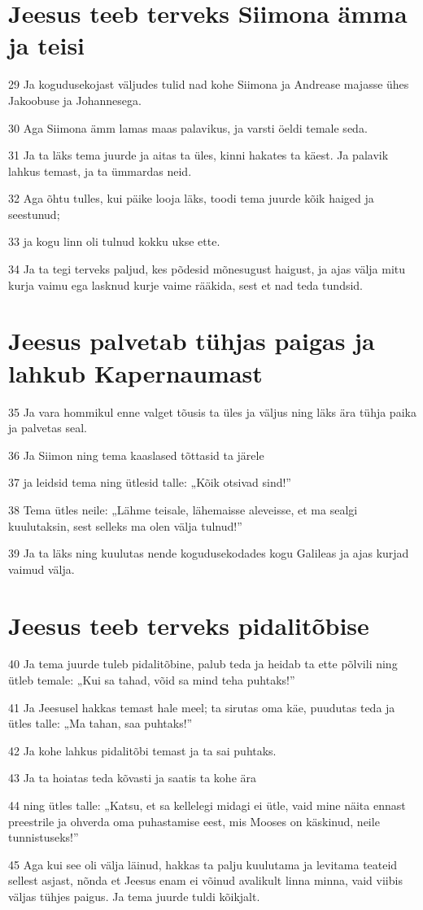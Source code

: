 \section*{Jeesus teeb terveks Siimona ämma ja teisi}

\par 29 Ja kogudusekojast väljudes tulid nad kohe Siimona ja Andrease majasse ühes Jakoobuse ja Johannesega.
\par 30 Aga Siimona ämm lamas maas palavikus, ja varsti öeldi temale seda.
\par 31 Ja ta läks tema juurde ja aitas ta üles, kinni hakates ta käest. Ja palavik lahkus temast, ja ta ümmardas neid.
\par 32 Aga õhtu tulles, kui päike looja läks, toodi tema juurde kõik haiged ja seestunud;
\par 33 ja kogu linn oli tulnud kokku ukse ette.
\par 34 Ja ta tegi terveks paljud, kes põdesid mõnesugust haigust, ja ajas välja mitu kurja vaimu ega lasknud kurje vaime rääkida, sest et nad teda tundsid.

\section*{Jeesus palvetab tühjas paigas ja lahkub Kapernaumast}

\par 35 Ja vara hommikul enne valget tõusis ta üles ja väljus ning läks ära tühja paika ja palvetas seal.
\par 36 Ja Siimon ning tema kaaslased tõttasid ta järele
\par 37 ja leidsid tema ning ütlesid talle: „Kõik otsivad sind!”
\par 38 Tema ütles neile: „Lähme teisale, lähemaisse aleveisse, et ma sealgi kuulutaksin, sest selleks ma olen välja tulnud!”
\par 39 Ja ta läks ning kuulutas nende kogudusekodades kogu Galileas ja ajas kurjad vaimud välja.

\section*{Jeesus teeb terveks pidalitõbise}

\par 40 Ja tema juurde tuleb pidalitõbine, palub teda ja heidab ta ette põlvili ning ütleb temale: „Kui sa tahad, võid sa mind teha puhtaks!”
\par 41 Ja Jeesusel hakkas temast hale meel; ta sirutas oma käe, puudutas teda ja ütles talle: „Ma tahan, saa puhtaks!”
\par 42 Ja kohe lahkus pidalitõbi temast ja ta sai puhtaks.
\par 43 Ja ta hoiatas teda kõvasti ja saatis ta kohe ära
\par 44 ning ütles talle: „Katsu, et sa kellelegi midagi ei ütle, vaid mine näita ennast preestrile ja ohverda oma puhastamise eest, mis Mooses on käskinud, neile tunnistuseks!”
\par 45 Aga kui see oli välja läinud, hakkas ta palju kuulutama ja levitama teateid sellest asjast, nõnda et Jeesus enam ei võinud avalikult linna minna, vaid viibis väljas tühjes paigus. Ja tema juurde tuldi kõikjalt.


